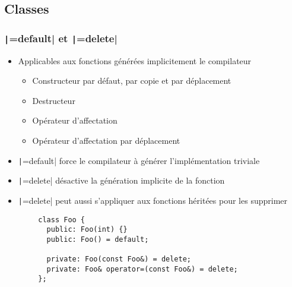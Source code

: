 \documentclass[C++.tex]{subfiles}
\begin{document}
\subsection*{Classes}
\begin{frame}[fragile]
	\frametitle{\texttt|=default| et \texttt|=delete|}
	\begin{itemize}
		\item Applicables aux fonctions générées implicitement le compilateur
		\begin{itemize}
			\item Constructeur par défaut, par copie et par déplacement
			\item Destructeur
			\item Opérateur d'affectation
			\item Opérateur d'affectation par déplacement
		\end{itemize}
		\item \texttt|=default| force le compilateur à générer l'implémentation triviale
		\item \texttt|=delete| désactive la génération implicite de la fonction
		\item \texttt|=delete| peut aussi s'appliquer aux fonctions héritées pour les supprimer
	\end{itemize}

	\begin{verbatim}
		class Foo {
		  public: Foo(int) {}
		  public: Foo() = default;

		  private: Foo(const Foo&) = delete;
		  private: Foo& operator=(const Foo&) = delete;
		};
	\end{verbatim}

\end{frame}
\end{document}

